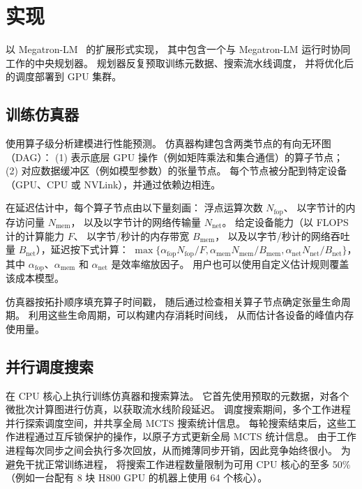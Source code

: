 \section{实现}
\label{section:implementation}

\sys{} 以 Megatron-LM~\cite{megatron-lm-arxiv20} 的扩展形式实现，
其中包含一个与 Megatron-LM 运行时协同工作的中央规划器。
规划器反复预取训练元数据、搜索流水线调度，
并将优化后的调度部署到 GPU 集群。

\subsection{训练仿真器}
\label{section:multimodal-training-simulator}

\sys{} 使用算子级分析建模进行性能预测。
仿真器构建包含两类节点的有向无环图（DAG）：
(1) 表示底层 GPU 操作（例如矩阵乘法和集合通信）的算子节点；
(2) 对应数据缓冲区（例如模型参数）的张量节点。
每个节点被分配到特定设备（GPU、CPU 或 NVLink），并通过依赖边相连。

在延迟估计中，每个算子节点由以下量刻画：
浮点运算次数 $N_\mathrm{fop}$、
以字节计的内存访问量 $N_\mathrm{mem}$，
以及以字节计的网络传输量 $N_\mathrm{net}$。
给定设备能力（以 FLOPS 计的计算能力 $F$、
以字节/秒计的内存带宽 $B_\mathrm{mem}$，
以及以字节/秒计的网络吞吐量 $B_\mathrm{net}$），延迟按下式计算：
$
\max\{
    \alpha_\mathrm{fop}N_\mathrm{fop}/F,
    \alpha_\mathrm{mem}N_\mathrm{mem}/B_\mathrm{mem},
    \alpha_\mathrm{net}N_\mathrm{net}/B_\mathrm{net}
\}
$，
其中 $\alpha_\mathrm{fop}$、$\alpha_\mathrm{mem}$ 和 $\alpha_\mathrm{net}$ 是效率缩放因子。
用户也可以使用自定义估计规则覆盖该成本模型。

仿真器按拓扑顺序填充算子时间戳，
随后通过检查相关算子节点确定张量生命周期。
利用这些生命周期，可以构建内存消耗时间线，
从而估计各设备的峰值内存使用量。

\subsection{并行调度搜索}

\sys{} 在 CPU 核心上执行训练仿真器和搜索算法。
它首先使用预取的元数据，对各个微批次计算图进行仿真，以获取流水线阶段延迟。
调度搜索期间，多个工作进程并行探索调度空间，并共享全局 MCTS 搜索统计信息。
每轮搜索结束后，这些工作进程通过互斥锁保护的操作，以原子方式更新全局 MCTS 统计信息。
由于工作进程每次同步之间会执行多次回放，从而摊薄同步开销，因此竞争始终很小。
为避免干扰正常训练进程，\sys{} 将搜索工作进程数量限制为可用 CPU 核心的至多 50\%
（例如一台配有 8 块 H800 GPU 的机器上使用 64 个核心）。

